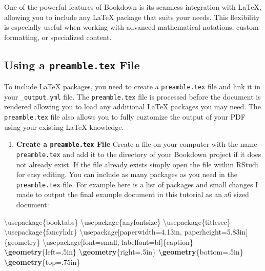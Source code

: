\documentclass[
]{book}
\newenvironment{Shaded}{\begin{snugshade}}{\end{snugshade}}
\newcommand{\BuiltInTok}[1]{#1}
\newcommand{\ExtensionTok}[1]{#1}
\newcommand{\FunctionTok}[1]{\textcolor[rgb]{0.13,0.29,0.53}{\textbf{#1}}}
\newcommand{\NormalTok}[1]{#1}
\providecommand{\tightlist}{%
  \setlength{\itemsep}{0pt}\setlength{\parskip}{0pt}}
\theoremstyle{definition}
\theoremstyle{definition}
\theoremstyle{definition}
\theoremstyle{definition}
\theoremstyle{remark}
\begin{document}
One of the powerful features of Bookdown is its seamless integration with LaTeX, allowing you to include any LaTeX package that suits your needs. This flexibility is especially useful when working with advanced mathematical notations, custom formatting, or specialized content.

\subsection{\texorpdfstring{Using a \texttt{preamble.tex} File}{Using a preamble.tex File}}\label{using-a-preamble.tex-file}

To include LaTeX packages, you need to create a \texttt{preamble.tex} file and link it in your \texttt{\_output.yml} file. The \texttt{preamble.tex} file is processed before the document is rendered allowing you to load any additional LaTeX packages you may need. The \texttt{preamble.tex} file also allows you to fully cuztomize the output of your PDF using your existing LaTeX knowledge.

\begin{enumerate}
\def\labelenumi{\arabic{enumi}.}
\tightlist
\item
  \textbf{Create a \texttt{preamble.tex} File}
  Create a file on your computer with the name \texttt{preamble.tex} and add it to the directory of your Bookdown project if it does not already exist. If the file already exists simply open the file within RStudi for easy editing. You can include as many packages as you need in the \texttt{preamble.tex} file. For example here is a list of packages and small changes I made to output the final example document in this tutorial as an a6 sized document:
\end{enumerate}

\begin{Shaded}
\begin{Highlighting}[]
\BuiltInTok{\textbackslash{}usepackage}\NormalTok{\{}\ExtensionTok{booktabs}\NormalTok{\}}
\BuiltInTok{\textbackslash{}usepackage}\NormalTok{\{}\ExtensionTok{anyfontsize}\NormalTok{\}}
\BuiltInTok{\textbackslash{}usepackage}\NormalTok{\{}\ExtensionTok{titlesec}\NormalTok{\}}
\BuiltInTok{\textbackslash{}usepackage}\NormalTok{\{}\ExtensionTok{fancyhdr}\NormalTok{\}}
\BuiltInTok{\textbackslash{}usepackage}\NormalTok{[paperwidth=4.13in, paperheight=5.83in]\{}\ExtensionTok{geometry}\NormalTok{\}}
\BuiltInTok{\textbackslash{}usepackage}\NormalTok{[font=small, labelfont=bf]\{}\ExtensionTok{caption}\NormalTok{\}}
\FunctionTok{\textbackslash{}geometry}\NormalTok{\{left=.5in\}}
\FunctionTok{\textbackslash{}geometry}\NormalTok{\{right=.5in\}}
\FunctionTok{\textbackslash{}geometry}\NormalTok{\{bottom=.5in\}}
\FunctionTok{\textbackslash{}geometry}\NormalTok{\{top=.75in\}}
\end{Highlighting}
\end{Shaded}
\end{document}
